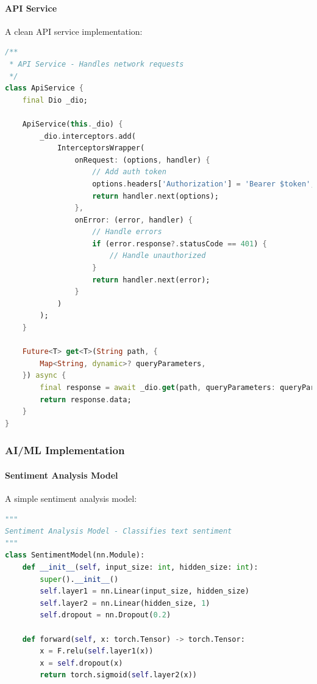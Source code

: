 \paragraph{API Service}
A clean API service implementation:

\begin{lstlisting}[language=Dart, caption={API Service Implementation}]
/**
 * API Service - Handles network requests
 */
class ApiService {
    final Dio _dio;
    
    ApiService(this._dio) {
        _dio.interceptors.add(
            InterceptorsWrapper(
                onRequest: (options, handler) {
                    // Add auth token
                    options.headers['Authorization'] = 'Bearer $token';
                    return handler.next(options);
                },
                onError: (error, handler) {
                    // Handle errors
                    if (error.response?.statusCode == 401) {
                        // Handle unauthorized
                    }
                    return handler.next(error);
                }
            )
        );
    }
    
    Future<T> get<T>(String path, {
        Map<String, dynamic>? queryParameters,
    }) async {
        final response = await _dio.get(path, queryParameters: queryParameters);
        return response.data;
    }
}
\end{lstlisting}

\subsubsection{AI/ML Implementation}
\label{subsubsec:ai_examples}

\paragraph{Sentiment Analysis Model}
A simple sentiment analysis model:

\begin{lstlisting}[language=Python, caption={Sentiment Analysis Model}]
"""
Sentiment Analysis Model - Classifies text sentiment
"""
class SentimentModel(nn.Module):
    def __init__(self, input_size: int, hidden_size: int):
        super().__init__()
        self.layer1 = nn.Linear(input_size, hidden_size)
        self.layer2 = nn.Linear(hidden_size, 1)
        self.dropout = nn.Dropout(0.2)

    def forward(self, x: torch.Tensor) -> torch.Tensor:
        x = F.relu(self.layer1(x))
        x = self.dropout(x)
        return torch.sigmoid(self.layer2(x))
\end{lstlisting}

